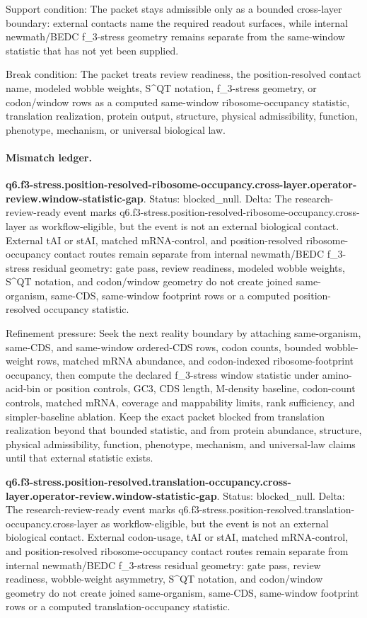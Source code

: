 Support condition: The packet stays admissible only as a bounded cross-layer boundary: external contacts name the required readout surfaces, while internal newmath/BEDC f\_3-stress geometry remains separate from the same-window statistic that has not yet been supplied.

Break condition: The packet treats review readiness, the position-resolved contact name, modeled wobble weights, S\textasciicircum{}QT notation, f\_3-stress geometry, or codon/window rows as a computed same-window ribosome-occupancy statistic, translation realization, protein output, structure, physical admissibility, function, phenotype, mechanism, or universal biological law.

\paragraph{Mismatch ledger.}
\textbf{q6.f3-stress.position-resolved-ribosome-occupancy.cross-layer.operator-review.window-statistic-gap}. Status: blocked\_null. Delta: The research-review-ready event marks q6.f3-stress.position-resolved-ribosome-occupancy.cross-layer as workflow-eligible, but the event is not an external biological contact. External tAI or stAI, matched mRNA-control, and position-resolved ribosome-occupancy contact routes remain separate from internal newmath/BEDC f\_3-stress residual geometry: gate pass, review readiness, modeled wobble weights, S\textasciicircum{}QT notation, and codon/window geometry do not create joined same-organism, same-CDS, same-window footprint rows or a computed position-resolved occupancy statistic.

Refinement pressure: Seek the next reality boundary by attaching same-organism, same-CDS, and same-window ordered-CDS rows, codon counts, bounded wobble-weight rows, matched mRNA abundance, and codon-indexed ribosome-footprint occupancy, then compute the declared f\_3-stress window statistic under amino-acid-bin or position controls, GC3, CDS length, M-density baseline, codon-count controls, matched mRNA, coverage and mappability limits, rank sufficiency, and simpler-baseline ablation. Keep the exact packet blocked from translation realization beyond that bounded statistic, and from protein abundance, structure, physical admissibility, function, phenotype, mechanism, and universal-law claims until that external statistic exists.

\textbf{q6.f3-stress.position-resolved.translation-occupancy.cross-layer.operator-review.window-statistic-gap}. Status: blocked\_null. Delta: The research-review-ready event marks q6.f3-stress.position-resolved.translation-occupancy.cross-layer as workflow-eligible, but the event is not an external biological contact. External codon-usage, tAI or stAI, matched mRNA-control, and position-resolved ribosome-occupancy contact routes remain separate from internal newmath/BEDC f\_3-stress residual geometry: gate pass, review readiness, wobble-weight asymmetry, S\textasciicircum{}QT notation, and codon/window geometry do not create joined same-organism, same-CDS, same-window footprint rows or a computed translation-occupancy statistic.

